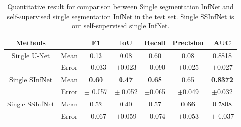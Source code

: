  \begin{table}[!ht]
 	\centering
 	\begin{tabular}{| c | c || c c c c c ||}
 		\hline
 		Methods & & F1 & IoU & Recall & Precision & AUC \\ \hline
 		Single U-Net & Mean & 0.13 & 0.08 & 0.60 & 0.08 & 0.8818 \\ \cline{2-7}
 		& Error & $\pm$0.033 & $\pm$0.023 & $\pm$0.090 & $\pm$0.025 & $\pm$0.027 \\ \hline
 		Single SInfNet &  Mean & \textbf{0.60} & \textbf{0.47} & \textbf{0.68} & 0.65 & \textbf{0.8372} \\ \cline{2-7}
 		& Error & $\pm$ 0.057 & $\pm$ 0.052 & $\pm$0.065 & $\pm$0.049  & $\pm$0.032 \\ \hline
 		Single SSInfNet &  Mean & 0.52 & 0.40 & 0.57 & \textbf{0.66} & 0.7808  \\ \cline{2-7}
 		& Error & $\pm$0.067 & $\pm$0.059 &$\pm$0.074  & $\pm$0.053 & $\pm$  0.037 \\ \hline
 	\end{tabular}
 	\caption{Quantitative result for comparison between Single segmentation InfNet and self-supervised single segmentation InfNet in the test set. Single SSInfNet is our self-supervised single InfNet.}
 	\label{tab:single}
 \end{table}


